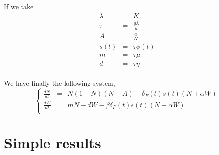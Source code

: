 \documentclass{article}
\begin{document}
If we take 
\[
\begin{array}{rcl}
\lambda & = & K \\
\tau & = & \frac{g\lambda}{a} \\
A & = & \frac{a}{K} \\
s(t) & = & \tau\phi(t) \\
m & = & \tau\mu \\
d & = & \tau\eta
\end{array}
\]
\paragraph{}
We have finally the following system,
\[
\left\lbrace
\begin{array}{rcl}
\frac{dN}{dt} & = & N(1-N)(N-A) - \delta_F(t)s(t)(N+\alpha W) \\
\frac{dW}{dt} & = & mN -dW - \beta\delta_F(t)s(t)(N+\alpha W) \\
\end{array}
\right.
\]



\newpage
\section{Simple results}



\paragraph{} %
\end{document}
